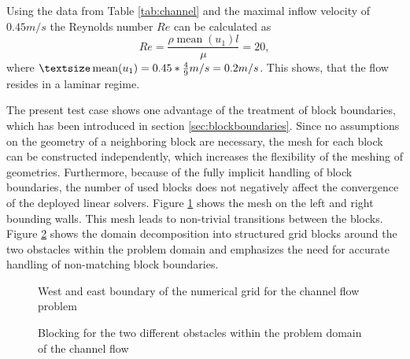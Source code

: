 Using the data from Table \ref{tab:channel} and the maximal inflow velocity of $0.45m/s$ the Reynolds number \(Re\) can be calculated as
\begin{displaymath}
  Re = \frac{\rho \operatorname{mean}(u_1) l}{\mu} = 20,
\end{displaymath}
where \(\textsize \operatorname{mean}(u_1) = 0.45*\frac{4}{9} m/s = 0.2 m/s\). This shows, that the flow resides in a laminar regime.

The present test case shows one advantage of the treatment of block boundaries, which has been introduced in section \ref{sec:blockboundaries}. Since no assumptions on the geometry of a neighboring block are necessary, the mesh for each block can be constructed independently, which increases the flexibility of the meshing of geometries. Furthermore, because of the fully implicit handling of block boundaries, the number of used blocks does not negatively affect the convergence of the deployed linear solvers. Figure \ref{fig:channel1} shows the mesh on the left and right bounding walls. This mesh leads to non-trivial transitions between the blocks. Figure \ref{fig:blocking} shows the domain decomposition into structured grid blocks around the two obstacles within the problem domain and emphasizes the need for accurate handling of non-matching block boundaries.

\begin{figure}
  \centering
  
  \caption{West and east boundary of the numerical grid for the channel flow problem}
  \label{fig:channel1}
\end{figure}

%  

\begin{figure}
   \centering
    \hfill
    \caption{Blocking for the two different obstacles within the problem domain of the channel flow}
    \label{fig:blocking}
\end{figure}

